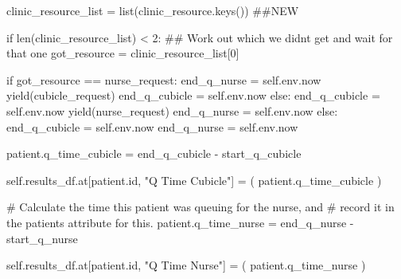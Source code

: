 \documentclass[
  letterpaper,
  DIV=11,
  numbers=noendperiod]{scrreprt}
\newenvironment{Shaded}{}{}
\newcommand{\BuiltInTok}[1]{\textcolor[rgb]{0.84,0.23,0.29}{#1}}
\newcommand{\CommentTok}[1]{\textcolor[rgb]{0.42,0.45,0.49}{#1}}
\newcommand{\ControlFlowTok}[1]{\textcolor[rgb]{0.84,0.23,0.29}{#1}}
\newcommand{\DecValTok}[1]{\textcolor[rgb]{0.00,0.36,0.77}{#1}}
\newcommand{\NormalTok}[1]{\textcolor[rgb]{0.14,0.16,0.18}{#1}}
\newcommand{\OperatorTok}[1]{\textcolor[rgb]{0.14,0.16,0.18}{#1}}
\newcommand{\StringTok}[1]{\textcolor[rgb]{0.01,0.18,0.38}{#1}}
\newcommand{\VariableTok}[1]{\textcolor[rgb]{0.89,0.38,0.04}{#1}}
\begin{document}
\begin{Shaded}
\begin{Highlighting}[]
\NormalTok{clinic\_resource\_list }\OperatorTok{=} \BuiltInTok{list}\NormalTok{(clinic\_resource.keys()) }\CommentTok{\#\#NEW}

\ControlFlowTok{if} \BuiltInTok{len}\NormalTok{(clinic\_resource\_list) }\OperatorTok{\textless{}} \DecValTok{2}\NormalTok{:}
    \CommentTok{\#\# Work out which we didn\textquotesingle{}t get and wait for that one}
\NormalTok{    got\_resource }\OperatorTok{=}\NormalTok{ clinic\_resource\_list[}\DecValTok{0}\NormalTok{]}

    \ControlFlowTok{if}\NormalTok{ got\_resource }\OperatorTok{==}\NormalTok{ nurse\_request:}
\NormalTok{        end\_q\_nurse }\OperatorTok{=} \VariableTok{self}\NormalTok{.env.now}
        \ControlFlowTok{yield}\NormalTok{(cubicle\_request)}
\NormalTok{        end\_q\_cubicle }\OperatorTok{=} \VariableTok{self}\NormalTok{.env.now}
    \ControlFlowTok{else}\NormalTok{:}
\NormalTok{        end\_q\_cubicle }\OperatorTok{=} \VariableTok{self}\NormalTok{.env.now}
        \ControlFlowTok{yield}\NormalTok{(nurse\_request)}
\NormalTok{        end\_q\_nurse }\OperatorTok{=} \VariableTok{self}\NormalTok{.env.now}
\ControlFlowTok{else}\NormalTok{:}
\NormalTok{    end\_q\_cubicle }\OperatorTok{=} \VariableTok{self}\NormalTok{.env.now}
\NormalTok{    end\_q\_nurse }\OperatorTok{=} \VariableTok{self}\NormalTok{.env.now}

\NormalTok{patient.q\_time\_cubicle }\OperatorTok{=}\NormalTok{ end\_q\_cubicle }\OperatorTok{{-}}\NormalTok{ start\_q\_cubicle}

\VariableTok{self}\NormalTok{.results\_df.at[patient.}\BuiltInTok{id}\NormalTok{, }\StringTok{"Q Time Cubicle"}\NormalTok{] }\OperatorTok{=}\NormalTok{ (}
\NormalTok{      patient.q\_time\_cubicle}
\NormalTok{)}

\CommentTok{\# Calculate the time this patient was queuing for the nurse, and}
\CommentTok{\# record it in the patient\textquotesingle{}s attribute for this.}
\NormalTok{patient.q\_time\_nurse }\OperatorTok{=}\NormalTok{ end\_q\_nurse }\OperatorTok{{-}}\NormalTok{ start\_q\_nurse}

\VariableTok{self}\NormalTok{.results\_df.at[patient.}\BuiltInTok{id}\NormalTok{, }\StringTok{"Q Time Nurse"}\NormalTok{] }\OperatorTok{=}\NormalTok{ (}
\NormalTok{  patient.q\_time\_nurse}
\NormalTok{)}
\end{Highlighting}
\end{Shaded}
\end{document}

